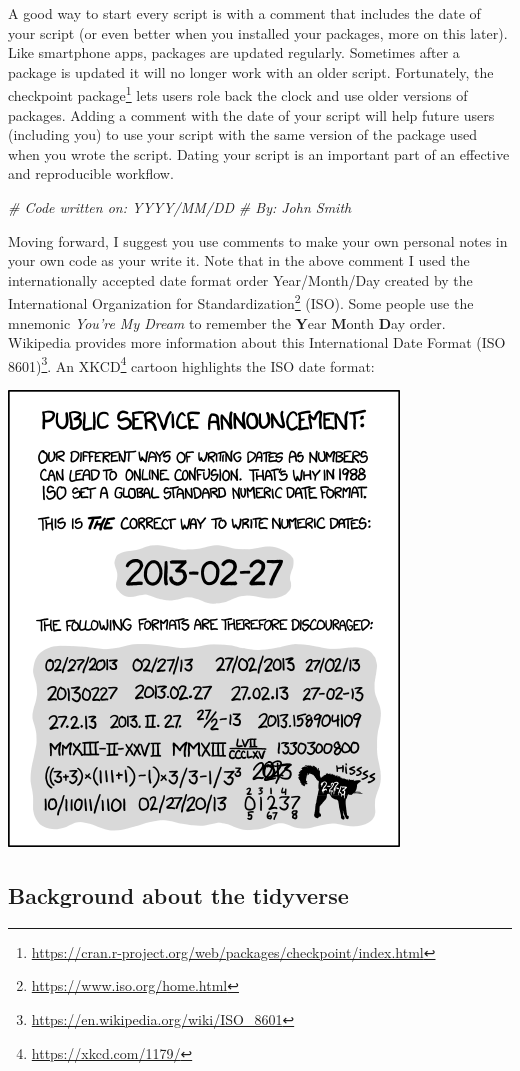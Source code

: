 \documentclass[
]{krantz}
\makeatletter
\newenvironment{Shaded}{\begin{snugshade}}{\end{snugshade}}
\newcommand{\CommentTok}[1]{\textcolor[rgb]{0.37,0.37,0.37}{\textit{#1}}}
\renewcommand{\href}[2]{#2\footnote{\url{#1}}}
\newenvironment{kframe}{%
\medskip{}
\setlength{\fboxsep}{.8em}
 \def\at@end@of@kframe{}%
 \ifinner\ifhmode%
  \def\at@end@of@kframe{\end{minipage}}%
  \begin{minipage}{\columnwidth}%
 \fi\fi%
 \def\FrameCommand##1{\hskip\@totalleftmargin \hskip-\fboxsep
 \colorbox{shadecolor}{##1}\hskip-\fboxsep
     \hskip-\linewidth \hskip-\@totalleftmargin \hskip\columnwidth}%
 \MakeFramed {\advance\hsize-\width
   \@totalleftmargin\z@ \linewidth\hsize
   \@setminipage}}%
 {\par\unskip\endMakeFramed%
 \at@end@of@kframe}
\renewenvironment{Shaded}{\begin{kframe}}{\end{kframe}}
\makeatother
\begin{document}
A good way to start every script is with a comment that includes the date of your script (or even better when you installed your packages, more on this later). Like smartphone apps, packages are updated regularly. Sometimes after a package is updated it will no longer work with an older script. Fortunately, the \href{https://cran.r-project.org/web/packages/checkpoint/index.html}{checkpoint package} lets users role back the clock and use older versions of packages. Adding a comment with the date of your script will help future users (including you) to use your script with the same version of the package used when you wrote the script. Dating your script is an important part of an effective and reproducible workflow.

\begin{Shaded}
\begin{Highlighting}[]
\CommentTok{\# Code written on: YYYY/MM/DD }
\CommentTok{\# By: John Smith}
\end{Highlighting}
\end{Shaded}

Moving forward, I suggest you use comments to make your own personal notes in your own code as your write it. Note that in the above comment I used the internationally accepted date format order Year/Month/Day created by the \href{https://www.iso.org/home.html}{International Organization for Standardization} (ISO). Some people use the mnemonic \emph{You're My Dream} to remember the \textbf{Y}ear \textbf{M}onth \textbf{D}ay order. Wikipedia provides more information about this \href{https://en.wikipedia.org/wiki/ISO_8601}{International Date Format (ISO 8601)}. An \href{https://xkcd.com/1179/}{XKCD} cartoon highlights the ISO date format:

\includegraphics[width=0.4\linewidth]{ch_introduction/images/iso8601}

\hypertarget{background-about-the-tidyverse}{%
\subsection{Background about the tidyverse}\label{background-about-the-tidyverse}}
\end{document}
